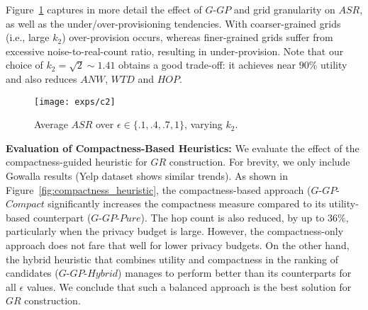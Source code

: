 \documentclass{USC-Thesis}
\numberwithin{equation}{chapter}
\begin{document}
Figure~\ref{fig:c2} captures in more detail the effect of $G$-$GP$ and grid granularity on
$\mathit{ASR}$, as well as the under/over-provisioning tendencies. With coarser-grained grids (i.e., large $k_2$) over-provision occurs, whereas finer-grained grids suffer from excessive noise-to-real-count ratio, resulting in under-provision. Note that our choice of $k_2=\sqrt{2}\sim 1.41$ obtains a good trade-off: it achieves near $90\%$ utility and also reduces $\mathit{ANW}$, $\mathit{WTD}$ and $\mathit{HOP}$.

\begin{figure}[!htb]\centering
	\texttt{[image: exps/c2]}
	\caption{Average $\mathit{ASR}$ over $\epsilon \in \{.1,.4,.7,1\}$, varying $k_2$.}
	\label{fig:c2}
\end{figure}

\textbf{Evaluation of Compactness-Based Heuristics:}
We evaluate the effect of the compactness-guided heuristic for $\mathit{GR}$ construction. For brevity, we only include Gowalla results (Yelp dataset shows similar trends). As shown in Figure~\ref{fig:compactness_heuristic}, the compactness-based approach ($G$-$\mathit{GP}$-$\mathit{Compact}$ significantly increases the compactness measure compared to its utility-based counterpart ($G$-$\mathit{GP}$-$\mathit{Pure}$). The hop count is also reduced, by up to $36\%$, particularly when the privacy budget is large. However, the compactness-only approach does not fare that well for lower privacy budgets. On the other hand, the hybrid heuristic that combines utility and compactness in the ranking of candidates ($G$-$\mathit{GP}$-$\mathit{Hybrid}$) manages to perform better than its counterparts for all $\epsilon$ values. We conclude that such a balanced approach is the best solution for $\mathit{GR}$ construction.
\end{document}
